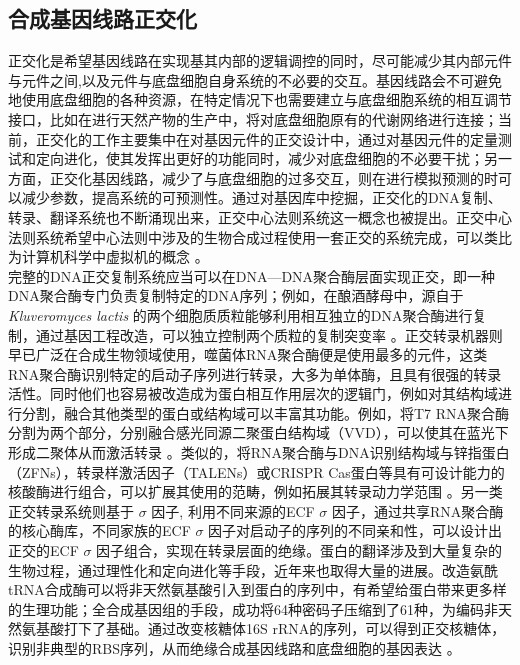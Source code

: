 \documentclass[b5paper,11pt,onecolumn,twoside,UTF8]{article}
\begin{document}
\subsection{合成基因线路正交化}
正交化是希望基因线路在实现基其内部的逻辑调控的同时，尽可能减少其内部元件与元件之间,以及元件与底盘细胞自身系统的不必要的交互。基因线路会不可避免地使用底盘细胞的各种资源，在特定情况下也需要建立与底盘细胞系统的相互调节接口，比如在进行天然产物的生产中，将对底盘细胞原有的代谢网络进行连接；当前，正交化的工作主要集中在对基因元件的正交设计中，通过对基因元件的定量测试和定向进化，使其发挥出更好的功能同时，减少对底盘细胞的不必要干扰；另一方面，正交化基因线路，减少了与底盘细胞的过多交互，则在进行模拟预测的时可以减少参数，提高系统的可预测性。通过对基因库中挖掘，正交化的DNA复制、转录、翻译系统也不断涌现出来，正交中心法则系统这一概念也被提出。正交中心法则系统希望中心法则中涉及的生物合成过程使用一套正交的系统完成，可以类比为计算机科学中虚拟机的概念 \cite{Liu2018b}。\\
\indent 完整的DNA正交复制系统应当可以在DNA---DNA聚合酶层面实现正交，即一种DNA聚合酶专门负责复制特定的DNA序列；例如，在酿酒酵母中，源自于\emph{Kluveromyces lactis} 的两个细胞质质粒能够利用相互独立的DNA聚合酶进行复制，通过基因工程改造，可以独立控制两个质粒的复制突变率 \cite{Ravikumar2014}。正交转录机器则早已广泛在合成生物领域使用，噬菌体RNA聚合酶便是使用最多的元件，这类RNA聚合酶识别特定的启动子序列进行转录，大多为单体酶，且具有很强的转录活性。同时他们也容易被改造成为蛋白相互作用层次的逻辑门，例如对其结构域进行分割，融合其他类型的蛋白或结构域可以丰富其功能。例如，将T7 RNA聚合酶分割为两个部分，分别融合感光同源二聚蛋白结构域（VVD），可以使其在蓝光下形成二聚体从而激活转录 \cite{Han2017, Baumschlager2017}。类似的，将RNA聚合酶与DNA识别结构域与锌指蛋白（ZFNs），转录样激活因子（TALENs）或CRISPR Cas蛋白等具有可设计能力的核酸酶进行组合，可以扩展其使用的范畴，例如拓展其转录动力学范围 \cite{McCutcheon2018}。另一类正交转录系统则基于 $\sigma$ 因子, 利用不同来源的ECF $\sigma$ 因子，通过共享RNA聚合酶的核心酶库，不同家族的ECF $\sigma$ 因子对启动子的序列的不同亲和性，可以设计出正交的ECF $\sigma$ 因子组合，实现在转录层面的绝缘\cite{rhodius2013}。蛋白的翻译涉及到大量复杂的生物过程，通过理性化和定向进化等手段，近年来也取得大量的进展。改造氨酰tRNA合成酶可以将非天然氨基酸引入到蛋白的序列中，有希望给蛋白带来更多样的生理功能；全合成基因组的手段，成功将64种密码子压缩到了61种，为编码非天然氨基酸打下了基础\cite{Fredens2019}。通过改变核糖体16S rRNA的序列，可以得到正交核糖体，识别非典型的RBS序列，从而绝缘合成基因线路和底盘细胞的基因表达 \cite{Rackham2005, An2009a}。\\
\end{document}
